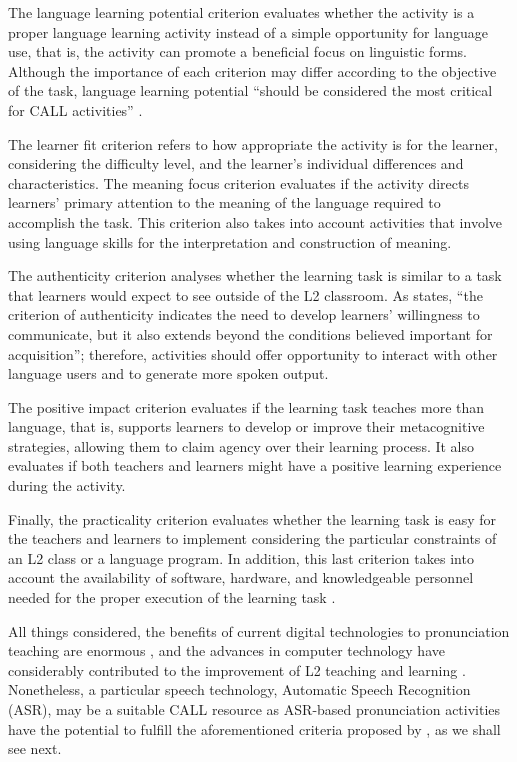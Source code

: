 \documentclass[english]{textolivre}
\begin{document}
The language learning potential criterion evaluates whether the activity
is a proper language learning activity instead of a simple opportunity
for language use, that is, the activity can promote a beneficial focus
on linguistic forms. Although the importance of each criterion may
differ according to the objective of the task, language learning
potential ``should be considered the most critical for CALL activities''
\cite[p.~58]{chapelle2001}.

The learner fit criterion refers to how appropriate the activity is for
the learner, considering the difficulty level, and the learner's
individual differences and characteristics. The meaning focus criterion
evaluates if the activity directs learners' primary attention to the
meaning of the language required to accomplish the task. This criterion
also takes into account activities that involve using language skills
for the interpretation and construction of meaning.


The authenticity criterion analyses whether the learning task is similar
to a task that learners would expect to see outside of the L2 classroom.
As \textcite[p.~56]{chapelle2001} states, ``the criterion of authenticity
indicates the need to develop learners' willingness to communicate, but
it also extends beyond the conditions believed important for
acquisition''; therefore, activities should offer opportunity to
interact with other language users and to generate more spoken output.

The positive impact criterion evaluates if the learning task teaches
more than language, that is, supports learners to develop or improve
their metacognitive strategies, allowing them to claim agency over their
learning process. It also evaluates if both teachers and learners might
have a positive learning experience during the activity.

Finally, the practicality criterion evaluates whether the learning task
is easy for the teachers and learners to implement considering the
particular constraints of an L2 class or a language program. In
addition, this last criterion takes into account the availability of
software, hardware, and knowledgeable personnel needed for the proper
execution of the learning task \cite{chapelle2001}.


All things considered, the benefits of current digital technologies to
pronunciation teaching are enormous \cite{obrien2018}, and the advances
in computer technology have considerably contributed to the improvement
of L2 teaching and learning \cite{cardoso2022}. Nonetheless, a
particular speech technology, Automatic Speech Recognition (ASR), may be
a suitable CALL resource as ASR-based pronunciation activities have the
potential to fulfill the aforementioned criteria proposed by \textcite{chapelle2001},
as we shall see next.
\end{document}
